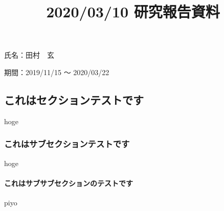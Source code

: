 \documentclass[a4j]{jarticle}
\title{2020/03/10 研究報告資料}
\author{}
\date{}
\begin{document}
\maketitle

氏名：田村　玄

期間：2019/11/15 ～ 2020/03/22

\subsection{これはセクションテストです}

hoge

\subsubsection{これはサブセクションテストです}

hoge

\paragraph{これはサブサブセクションのテストです}

piyo
\end{document}

